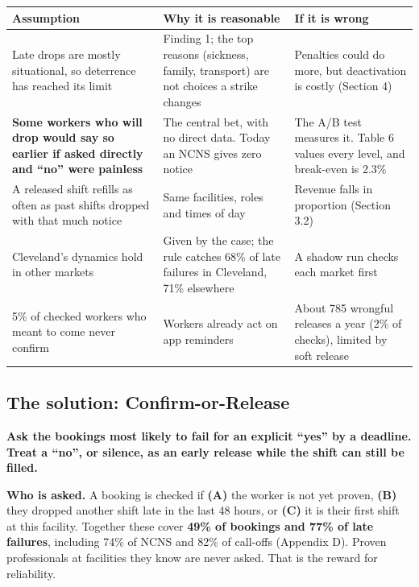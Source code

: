 \documentclass[11pt]{article}
\begin{document}
\begin{center}\small
{}
\begin{tabularx}{\textwidth}{@{}P{0.30\textwidth}LL@{}}
\toprule
Assumption & Why it is reasonable & If it is wrong \\
\midrule
Late drops are mostly situational, so deterrence has reached its limit & Finding 1; the top reasons (sickness, family,
transport) are not choices a strike changes & Penalties could do more, but deactivation is costly (Section 4) \\
\textbf{Some workers who will drop would say so earlier if asked directly and ``no'' were painless} & The central bet,
with no direct data. Today an NCNS gives zero notice & The A/B test measures it. Table 6 values every level, and
break-even is 2.3\% \\
A released shift refills as often as past shifts dropped with that much notice & Same facilities, roles and times of day
& Revenue falls in proportion (Section 3.2) \\
Cleveland's dynamics hold in other markets & Given by the case; the rule catches 68\% of late failures in Cleveland, 71\%
elsewhere & A shadow run checks each market first \\
5\% of checked workers who meant to come never confirm & Workers already act on app reminders & About 785 wrongful
releases a year (2\% of checks), limited by soft release \\
\bottomrule
\end{tabularx}
\end{center}

\subsection{The solution: Confirm-or-Release}

\begin{callout}
\textbf{Ask the bookings most likely to fail for an explicit ``yes'' by a deadline. Treat a ``no'', or silence, as an
early release while the shift can still be filled.}
\end{callout}

\textbf{Who is asked.} A booking is checked if \textbf{(A)} the worker is not yet proven, \textbf{(B)} they dropped
another shift late in the last 48 hours, or \textbf{(C)} it is their first shift at this facility. Together these cover
\textbf{49\% of bookings and 77\% of late failures}, including 74\% of NCNS and 82\% of call-offs (Appendix D). Proven
professionals at facilities they know are never asked. That is the reward for reliability.
\end{document}
